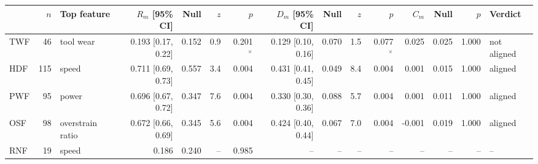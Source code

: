 \begin{tabular}{@{}lrlrrrrrrrrrrrl@{}}
\toprule
& $n$ & Top feature & $R_m$ [95\% CI] & Null & $z$ & $p$ & $D_m$ [95\% CI] & Null & $z$ & $p$ & $C_m$ & Null & $p$ & Verdict \\
\midrule
TWF & 46 & tool wear & 0.193 [0.17, 0.22] & 0.152 & 0.9 & 0.201$^{\times}$ & 0.129 [0.10, 0.16] & 0.070 & 1.5 & 0.077$^{\times}$ & 0.025 & 0.025 & 1.000 & not aligned \\
HDF & 115 & speed & 0.711 [0.69, 0.73] & 0.557 & 3.4 & 0.004 & 0.431 [0.41, 0.45] & 0.049 & 8.4 & 0.004 & 0.001 & 0.015 & 1.000 & aligned \\
PWF & 95 & power & 0.696 [0.67, 0.72] & 0.347 & 7.6 & 0.004 & 0.330 [0.30, 0.36] & 0.088 & 5.7 & 0.004 & 0.001 & 0.011 & 1.000 & aligned \\
OSF & 98 & overstrain ratio & 0.672 [0.66, 0.69] & 0.345 & 5.6 & 0.004 & 0.424 [0.40, 0.44] & 0.067 & 7.0 & 0.004 & -0.001 & 0.019 & 1.000 & aligned \\
RNF & 19 & speed & 0.186 & 0.240 & -- & 0.985 & -- & -- & -- & -- & -- & -- & -- & -- \\
\bottomrule
\end{tabular}
